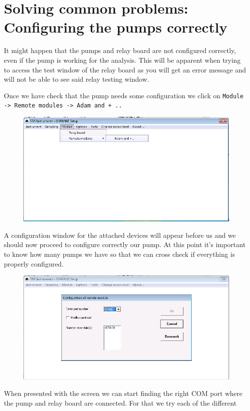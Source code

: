 \documentclass[31pt]{article}
\begin{document}
\newpage

\section{Solving common problems: Configuring the pumps correctly}

It might happen that the pumps and relay board are not configured correctly, even if the pump is working for the analysis. This will be apparent when trying to access the test window of the relay board as you will get an error message and will not be able to see said relay testing window.

Once we have check that the pump needs some configuration we click on \texttt{Module -> Remote modules -> Adam and + ..} 

\begin{figure}[h]
\centering
\includegraphics[width=.9\textwidth]{12AddRemote.png}
\label{fig:univerise}
\end{figure}

A configuration window for the attached devices will appear before us and we should now proceed to configure correctly our pump. At this point it's important to know how many pumps we have so that we can cross check if everything is properly configured.

\begin{figure}[h]
\centering
\includegraphics[width=.9\textwidth]{13ComConfig.png}
\label{fig:univerise}
\end{figure}

When presented with the screen we can start finding the right COM port where the pump and relay board are connected. For that we try each of the different
\end{document}
